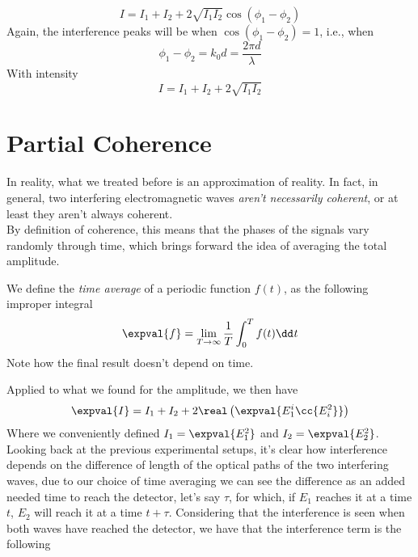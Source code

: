 \documentclass[../electromagnetism.tex]{subfiles}
\begin{document}
\begin{equation*}
	I=I_1+I_2+2\sqrt{I_1I_2}\cos\left( \phi_1-\phi_2 \right)
\end{equation*}
Again, the interference peaks will be when $\cos\left( \phi_1-\phi_2 \right)=1$, i.e., when
\begin{equation}
	\phi_1-\phi_2=k_0d=\frac{2\pi d}{\lambda}
	\label{eq:interferencepeaksmichmorley}
\end{equation}
With intensity
\begin{equation}
	I=I_1+I_2+2\sqrt{I_1I_2}
	\label{eq:peakintmichmorley}
\end{equation}
\section{Partial Coherence}
In reality, what we treated before is an approximation of reality. In fact, in general, two interfering electromagnetic waves \textit{aren't necessarily coherent}, or at least they aren't always coherent.\\
By definition of coherence, this means that the phases of the signals vary randomly through time, which brings forward the idea of averaging the total amplitude.
\begin{dfn}
	We define the \emph{time average} of a periodic function $f(t)$, as the following improper integral
	\begin{equation}
		\expval{f}=\lim_{T\to\infty}\frac{1}{T}\int_{0}^{T}f(t)\dd^{}{t}
		\label{eq:timeaveragedfn}
	\end{equation}
	Note how the final result doesn't depend on time.
\end{dfn}
Applied to what we found for the amplitude, we then have
\begin{equation}
	\expval{I}=I_1+I_2+2\real\left( \expval{E_1^i\cc{E_i^2}} \right)
	\label{eq:intterm}
\end{equation}
Where we conveniently defined $I_1=\expval{E_1^2}$ and $I_2=\expval{E_2^2}$.\\
Looking back at the previous experimental setups, it's clear how interference depends on the difference of length of the optical paths of the two interfering waves, due to our choice of time averaging we can see the difference as an added needed time to reach the detector, let's say $\tau$, for which, if $E_1$ reaches it at a time $t$, $E_2$ will reach it at a time $t+\tau$. Considering that the interference is seen when both waves have reached the detector, we have that the interference term is the following
\end{document}
